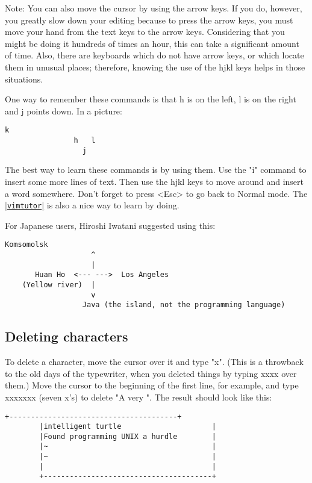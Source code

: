 Note:
You can also move the cursor by using the arrow keys.
If you do, however, you greatly slow down your editing because to press the arrow keys, you must move your hand from the text keys to the arrow keys.
Considering that you might be doing it hundreds of times an hour, this can take a significant amount of time.
Also, there are keyboards which do not have arrow keys, or which locate them in unusual places; therefore, knowing the use of the hjkl keys helps in those situations.

One way to remember these commands is that h is on the left, l is on the right and j points down.
In a picture: 

\begin{Verbatim}[samepage=true]
				  k
				h   l
				  j
\end{Verbatim}

The best way to learn these commands is by using them.
Use the "i" command to insert some more lines of text.
Then use the hjkl keys to move around and insert a word somewhere.
Don't forget to press <Esc> to go back to Normal mode.
The \hyperref[vimtutor]{|\texttt{vimtutor}|} is also a nice way to learn by doing.

For Japanese users, Hiroshi Iwatani suggested using this:

\begin{Verbatim}[samepage=true]
                Komsomolsk
                    ^
                    |
       Huan Ho  <--- --->  Los Angeles
    (Yellow river)  |
                    v
                  Java (the island, not the programming language)
\end{Verbatim}

\subsection{Deleting characters}

To delete a character, move the cursor over it and type "x".
(This is a throwback to the old days of the typewriter, when you deleted things by typing xxxx over them.)
Move the cursor to the beginning of the first line, for example, and type xxxxxxx (seven x's) to delete "A very ".
The result should look like this: 

		\begin{Verbatim}[samepage=true]
		+---------------------------------------+
		|intelligent turtle                     |
		|Found programming UNIX a hurdle        |
		|~                                      |
		|~                                      |
		|                                       |
		+---------------------------------------+
		\end{Verbatim}

